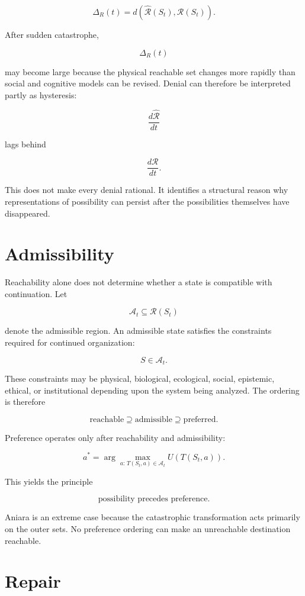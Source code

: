 \documentclass[11pt,oneside]{book}
\theoremstyle{definition}
\theoremstyle{remark}
\begin{document}
\[
\Delta_R(t) = d\!\left( \widehat{\mathcal{R}}(S_t), \mathcal{R}(S_t) \right).
\]

After sudden catastrophe,

\[
\Delta_R(t)
\]

may become large because the physical reachable set changes more rapidly than social and cognitive
models can be revised. Denial can therefore be interpreted partly as hysteresis:

\[
\frac{d\widehat{\mathcal{R}}}{dt}
\]

lags behind

\[
\frac{d\mathcal{R}}{dt}.
\]

This does not make every denial rational. It identifies a structural reason why representations of
possibility can persist after the possibilities themselves have disappeared.

\section{Admissibility}

Reachability alone does not determine whether a state is compatible with continuation. Let

\[
\mathcal{A}_t\subseteq\mathcal{R}(S_t)
\]

denote the admissible region. An admissible state satisfies the constraints required for continued
organization:

\[
S\in\mathcal{A}_t.
\]

These constraints may be physical, biological, ecological, social, epistemic, ethical, or
institutional depending upon the system being analyzed. The ordering is therefore

\[
\text{reachable} \supseteq \text{admissible} \supseteq \text{preferred}.
\]

Preference operates only after reachability and admissibility:

\[
a^* = \arg\max_{a:\,T(S_t,a)\in\mathcal{A}_t} U\!\left(T(S_t,a)\right).
\]

This yields the principle

\[
\boxed{ \text{possibility precedes preference}. }
\]

Aniara is an extreme case because the catastrophic transformation acts primarily on the outer sets.
No preference ordering can make an unreachable destination reachable.

\section{Repair}
\end{document}
